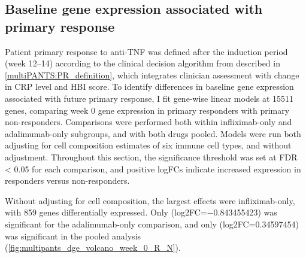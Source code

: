 \subsection{Baseline gene expression associated with primary response}


Patient primary response to anti-\gls{TNF} was defined after the induction period (week \numrange{12}{14}) according to the clinical decision algorithm from \textcite{kennedy2019PredictorsAntiTNFTreatment} described in \autoref{multiPANTS:PR_definition}, 
which integrates clinician assessment with change in \gls{CRP} level and \gls{HBI} score.
To identify differences in baseline gene expression associated with future primary response, 
I fit gene-wise linear models at 15511 genes, comparing week 0 gene expression in primary responders with primary non-responders.
Comparisons were performed both within infliximab-only and adalimumab-only subgroups, and with both drugs pooled.
Models were run both adjusting for cell composition estimates of six immune cell types, and without adjustment.
Throughout this section, the significance threshold was set at FDR < 0.05 for each comparison, and positive logFCs indicate increased expression in responders versus non-responders.

Without adjusting for cell composition, the largest effects were infliximab-only, with 859 genes differentially expressed.
Only  (log2FC=\num{-0.843455423}) was significant for the adalimumab-only comparison, 
and only  (log2FC=\num{0.34597454}) was significant in the pooled analysis (\autoref{fig:multipants_dge_volcano_week_0_R_N}).

